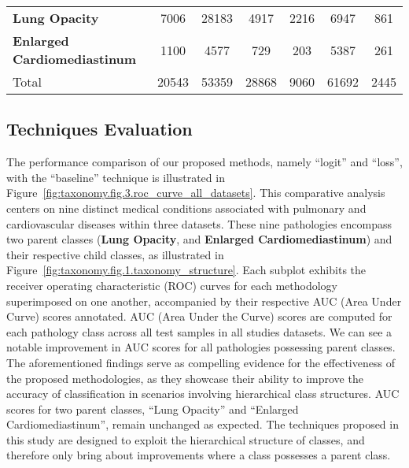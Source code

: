 \documentclass[authoryear,preprint,review,12pt]{elsarticle}
\begin{document}
\begin{table}[htbp]
\begin{tabular}{lcccccc}
\textbf{Lung Opacity} & 7006 & 28183 & \cellcolor[HTML]{E9ECE6}4917 & \cellcolor[HTML]{E9ECE6}2216 & \cellcolor[HTML]{E9ECE6}6947 & \cellcolor[HTML]{E9ECE6}861 \\
\textbf{Enlarged Cardiomediastinum} & 1100 & 4577 & \cellcolor[HTML]{E9ECE6}729 & \cellcolor[HTML]{E9ECE6}203 & \cellcolor[HTML]{E9ECE6}5387 & \cellcolor[HTML]{E9ECE6}261 \\
\rowcolor[HTML]{79A8A4}
{\color[HTML]{FFFFFF} Total} & {\color[HTML]{FFFFFF} 20543} & {\color[HTML]{FFFFFF} 53359} & {\color[HTML]{FFFFFF} 28868} & {\color[HTML]{FFFFFF} 9060} & {\color[HTML]{FFFFFF} 61692} & {\color[HTML]{FFFFFF} 2445}
\end{tabular}
\end{table}
%
\subsection{Techniques Evaluation}
The performance comparison of our proposed methods, namely ``logit'' and ``loss'', with the ``baseline'' technique is illustrated in Figure~\ref{fig:taxonomy.fig.3.roc_curve_all_datasets}. This comparative analysis centers on nine distinct medical conditions associated with pulmonary and cardiovascular diseases within three datasets. These nine pathologies encompass two parent classes (\textbf{Lung Opacity}, and \textbf{Enlarged Cardiomediastinum}) and their respective child classes, as illustrated in Figure~\ref{fig:taxonomy.fig.1.taxonomy_structure}. Each subplot exhibits the receiver operating characteristic (ROC) curves for each methodology superimposed on one another, accompanied by their respective AUC (Area Under Curve) scores annotated. AUC (Area Under the Curve) scores are computed for each pathology class across all test samples in all studies datasets. We can see a notable improvement in AUC scores for all pathologies possessing parent classes. The aforementioned findings serve as compelling evidence for the effectiveness of the proposed methodologies, as they showcase their ability to improve the accuracy of classification in scenarios involving hierarchical class structures. AUC scores for two parent classes, ``Lung Opacity'' and ``Enlarged Cardiomediastinum'', remain unchanged as expected. The techniques proposed in this study are designed to exploit the hierarchical structure of classes, and therefore only bring about improvements where a class possesses a parent class.
\end{document}
